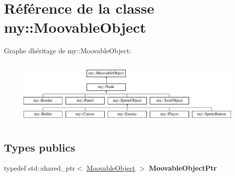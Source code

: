 \hypertarget{classmy_1_1MoovableObject}{}\section{Référence de la classe my\+:\+:Moovable\+Object}
\label{classmy_1_1MoovableObject}
Graphe d\textquotesingle{}héritage de my\+:\+:Moovable\+Object\+:\begin{figure}[H]
\begin{center}
\leavevmode
\includegraphics[height=3.318518cm]{classmy_1_1MoovableObject}
\end{center}
\end{figure}
\subsection*{Types publics}
\begin{DoxyCompactItemize}
\item 
\mbox{\label{classmy_1_1MoovableObject_a2fd474d748e95a8439e00ac45ce4c419}} 
typedef std\+::shared\+\_\+ptr$<$ \hyperlink{classmy_1_1MoovableObject}{Moovable\+Object} $>$ {\bfseries Moovable\+Object\+Ptr}
\end{DoxyCompactItemize}
